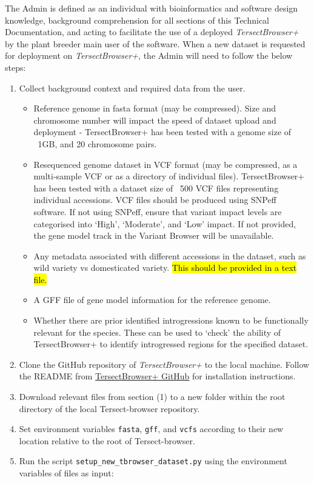 \documentclass[12pt]{article}
\begin{document}
The Admin is defined as an individual with bioinformatics and software design knowledge, background comprehension for all sections of this Technical Documentation, and acting to facilitate the use of a deployed \textit{TersectBrowser+} by the plant breeder main user of the software. When a new dataset is requested for deployment on  \textit{TersectBrowser+}, the Admin will need to follow the below steps:
\begin{enumerate}
    \item Collect background context and required data from the user.
\begin{itemize}
    \item Reference genome in fasta format (may be compressed). Size and chromosome number will impact the speed of dataset upload and deployment - TersectBrowser+ has been tested with a genome size of ~1GB, and 20 chromosome pairs.
    \item Resequenced genome dataset in VCF format (may be compressed, as a multi-sample VCF or as a directory of individual files). TersectBrowser+ has been tested with a dataset size of ~500 VCF files representing individual accessions. VCF files should be produced using SNPeff software. If not using SNPeff, ensure that variant impact levels are categorised into `High', `Moderate', and `Low' impact. If not provided, the gene model track in the Variant Browser will be unavailable. 
    \item Any metadata associated with different accessions in the dataset, such as wild variety vs domesticated variety. \hl{This should be provided in a text file.}
    \item A GFF file of gene model information for the reference genome. 
    \item Whether there are prior identified introgressions known to be functionally relevant for the species. These can be used to `check' the ability of TersectBrowser+ to identify introgressed regions for the specified dataset.
\end{itemize}
    \item Clone the GitHub repository of  \textit{TersectBrowser+} to the local machine. Follow the README from \hyperlink {https://github.com/Tersect-Browser/Tersect-browser.git}{TersectBrowser+ GitHub} for installation instructions.
    \item Download relevant files from section (1) to a new folder within the root directory of the local Tersect-browser repository.
    \item Set environment variables \verb+fasta+, \verb+gff+, and \verb+vcfs+ according to their new location relative to the root of Tersect-browser.
    \item Run the script \verb+setup_new_tbrowser_dataset.py+ using the environment variables of files as input:
    

\end{enumerate}
\end{document}

